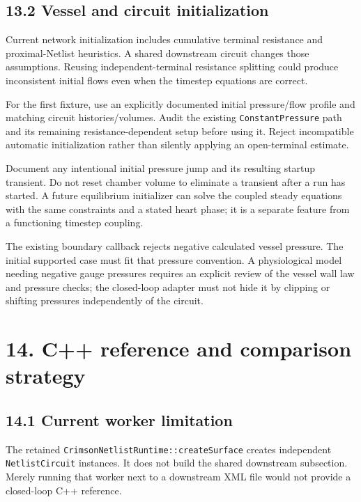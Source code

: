 \documentclass[11pt,a4paper]{article}
\begin{document}
\subsection{13.2 Vessel and circuit initialization}
Current network initialization includes cumulative terminal resistance and proximal-Netlist heuristics. A shared downstream circuit changes those assumptions. Reusing independent-terminal resistance splitting could produce inconsistent initial flows even when the timestep equations are correct.

For the first fixture, use an explicitly documented initial pressure/flow profile and matching circuit histories/volumes. Audit the existing \texttt{Constant\allowbreak{}Pressure} path and its remaining resistance-dependent setup before using it. Reject incompatible automatic initialization rather than silently applying an open-terminal estimate.

Document any intentional initial pressure jump and its resulting startup transient. Do not reset chamber volume to eliminate a transient after a run has started. A future equilibrium initializer can solve the coupled steady equations with the same constraints and a stated heart phase; it is a separate feature from a functioning timestep coupling.

The existing boundary callback rejects negative calculated vessel pressure. The initial supported case must fit that pressure convention. A physiological model needing negative gauge pressures requires an explicit review of the vessel wall law and pressure checks; the closed-loop adapter must not hide it by clipping or shifting pressures independently of the circuit.

\section{14. C++ reference and comparison strategy}
\subsection{14.1 Current worker limitation}
The retained \texttt{Crimson\allowbreak{}Netlist\allowbreak{}Runtime:\allowbreak{}:\allowbreak{}create\allowbreak{}Surface} creates independent \texttt{Netlist\allowbreak{}Circuit} instances. It does not build the shared downstream subsection. Merely running that worker next to a downstream XML file would not provide a closed-loop C++ reference.
\end{document}
